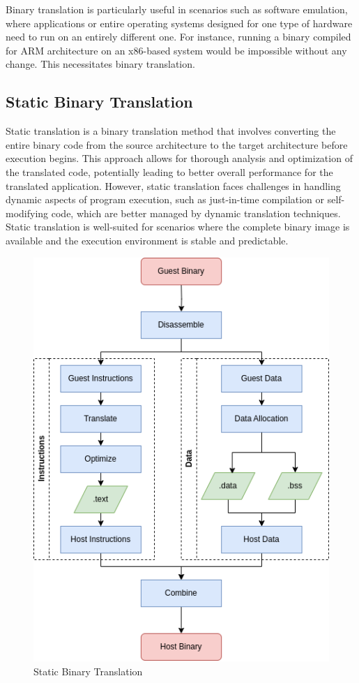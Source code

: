 Binary translation is particularly useful in scenarios such as software emulation, where applications or entire operating systems designed for one type of hardware need to run on an entirely different one.
For instance, running a binary compiled for ARM architecture on an x86-based system would be impossible without any change. This necessitates binary translation.

\subsection{Static Binary Translation}
Static translation is a binary translation method that involves converting the entire binary code from the source architecture to the target architecture before execution begins.
This approach allows for thorough analysis and optimization of the translated code, potentially leading to better overall performance for the translated application.
However, static translation faces challenges in handling dynamic aspects of program execution, such as just-in-time compilation or self-modifying code, which are better managed by dynamic translation techniques.
Static translation is well-suited for scenarios where the complete binary image is available and the execution environment is stable and predictable.
\begin{figure}[ht]
    \centering
    \includegraphics[width=0.6\linewidth]{figures/sta_bin_trans}
    \caption{Static Binary Translation}
    \label{fig:static_binary_translation}
\end{figure}

